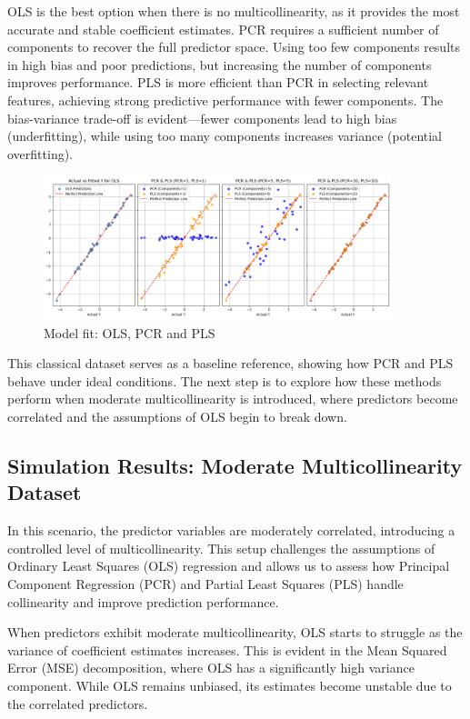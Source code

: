 \documentclass[11pt,twoside,a4paper]{article}
\begin{document}
OLS is the best option when there is no multicollinearity, as it provides the most accurate and stable coefficient estimates. PCR requires a sufficient number of components to recover the full predictor space. Using too few components results in high bias and poor predictions, but increasing the number of components improves performance. PLS is more efficient than PCR in selecting relevant features, achieving strong predictive performance with fewer components. The bias-variance trade-off is evident—fewer components lead to high bias (underfitting), while using too many components increases variance (potential overfitting).

\begin{figure}[H]
    \centering
    \includegraphics[width=0.9\textwidth]{Third_plot.png}
    \caption{Model fit: OLS, PCR and PLS}
    \label{fig:PLS_analysis}
\end{figure}

This classical dataset serves as a baseline reference, showing how PCR and PLS behave under ideal conditions. The next step is to explore how these methods perform when moderate multicollinearity is introduced, where predictors become correlated and the assumptions of OLS begin to break down.


\subsection{Simulation Results: Moderate Multicollinearity Dataset}  

In this scenario, the predictor variables are moderately correlated, introducing a controlled level of multicollinearity. This setup challenges the assumptions of Ordinary Least Squares (OLS) regression and allows us to assess how Principal Component Regression (PCR) and Partial Least Squares (PLS) handle collinearity and improve prediction performance.

When predictors exhibit moderate multicollinearity, OLS starts to struggle as the variance of coefficient estimates increases. This is evident in the Mean Squared Error (MSE) decomposition, where OLS has a significantly high variance component. While OLS remains unbiased, its estimates become unstable due to the correlated predictors.
\end{document}
